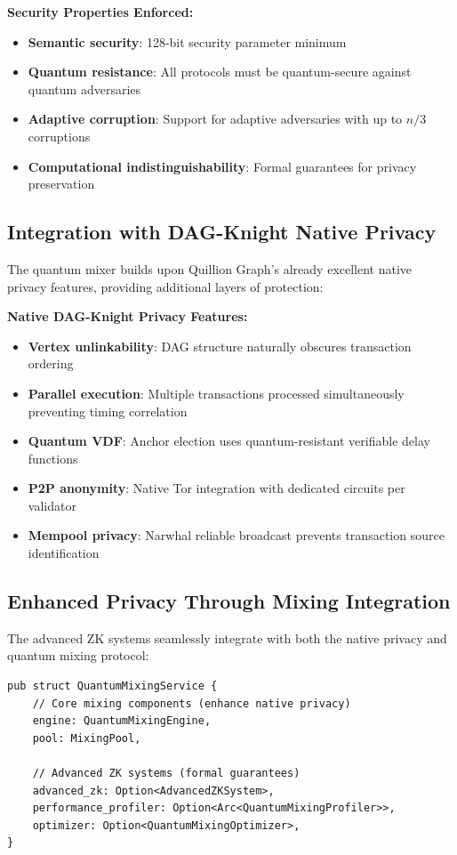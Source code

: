 \documentclass[12pt,a4paper]{article}
\begin{document}
\textbf{Security Properties Enforced:}
\begin{itemize}
\item \textbf{Semantic security}: 128-bit security parameter minimum
\item \textbf{Quantum resistance}: All protocols must be quantum-secure against quantum adversaries
\item \textbf{Adaptive corruption}: Support for adaptive adversaries with up to $n/3$ corruptions
\item \textbf{Computational indistinguishability}: Formal guarantees for privacy preservation
\end{itemize}

\subsection{Integration with DAG-Knight Native Privacy}

The quantum mixer builds upon Quillion Graph's already excellent native privacy features, providing additional layers of protection:

\textbf{Native DAG-Knight Privacy Features:}
\begin{itemize}
\item \textbf{Vertex unlinkability}: DAG structure naturally obscures transaction ordering
\item \textbf{Parallel execution}: Multiple transactions processed simultaneously preventing timing correlation
\item \textbf{Quantum VDF}: Anchor election uses quantum-resistant verifiable delay functions
\item \textbf{P2P anonymity}: Native Tor integration with dedicated circuits per validator
\item \textbf{Mempool privacy}: Narwhal reliable broadcast prevents transaction source identification
\end{itemize}

\subsection{Enhanced Privacy Through Mixing Integration}

The advanced ZK systems seamlessly integrate with both the native privacy and quantum mixing protocol:

\begin{lstlisting}[style=rustcode, caption=Advanced ZK Integration]
pub struct QuantumMixingService {
    // Core mixing components (enhance native privacy)
    engine: QuantumMixingEngine,
    pool: MixingPool,
    
    // Advanced ZK systems (formal guarantees)
    advanced_zk: Option<AdvancedZKSystem>,
    performance_profiler: Option<Arc<QuantumMixingProfiler>>,
    optimizer: Option<QuantumMixingOptimizer>,
}
\end{lstlisting}
\end{document}
